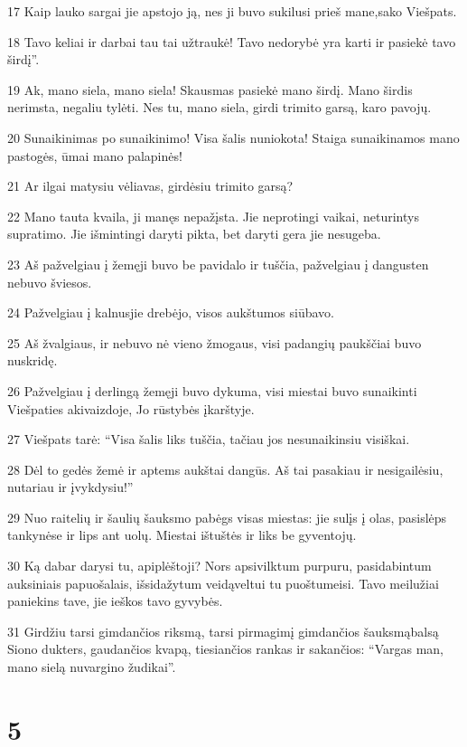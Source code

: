 \par 17 Kaip lauko sargai jie apstojo ją, nes ji buvo sukilusi prieš mane,­sako Viešpats.­ 
\par 18 Tavo keliai ir darbai tau tai užtraukė! Tavo nedorybė yra karti ir pasiekė tavo širdį”. 
\par 19 Ak, mano siela, mano siela! Skausmas pasiekė mano širdį. Mano širdis nerimsta, negaliu tylėti. Nes tu, mano siela, girdi trimito garsą, karo pavojų. 
\par 20 Sunaikinimas po sunaikinimo! Visa šalis nuniokota! Staiga sunaikinamos mano pastogės, ūmai­ mano palapinės! 
\par 21 Ar ilgai matysiu vėliavas, girdėsiu trimito garsą? 
\par 22 Mano tauta kvaila, ji manęs nepažįsta. Jie neprotingi vaikai, neturintys supratimo. Jie išmintingi daryti pikta, bet daryti gera jie nesugeba. 
\par 23 Aš pažvelgiau į žemę­ji buvo be pavidalo ir tuščia, pažvelgiau į dangus­ten nebuvo šviesos. 
\par 24 Pažvelgiau į kalnus­jie drebėjo, visos aukštumos siūbavo. 
\par 25 Aš žvalgiaus, ir nebuvo nė vieno žmogaus, visi padangių paukščiai buvo nuskridę. 
\par 26 Pažvelgiau į derlingą žemę­ji buvo dykuma, visi miestai buvo sunaikinti Viešpaties akivaizdoje, Jo rūstybės įkarštyje. 
\par 27 Viešpats tarė: “Visa šalis liks tuščia, tačiau jos nesunaikinsiu visiškai. 
\par 28 Dėl to gedės žemė ir aptems aukštai dangūs. Aš tai pasakiau ir nesigailėsiu, nutariau ir įvykdysiu!” 
\par 29 Nuo raitelių ir šaulių šauksmo pabėgs visas miestas: jie sulįs į olas, pasislėps tankynėse ir lips ant uolų. Miestai ištuštės ir liks be gyventojų. 
\par 30 Ką dabar darysi tu, apiplėštoji? Nors apsivilktum purpuru, pasidabintum auksiniais papuošalais, išsidažytum veidą­veltui tu puoštumeisi. Tavo meilužiai paniekins tave, jie ieškos tavo gyvybės. 
\par 31 Girdžiu tarsi gimdančios riksmą, tarsi pirmagimį gimdančios šauksmą­balsą Siono dukters, gaudančios kvapą, tiesiančios rankas ir sakančios: “Vargas man, mano sielą nuvargino žudikai”.



\chapter{5}


